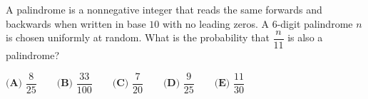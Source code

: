 A palindrome is a nonnegative integer that reads the same forwards and backwards when written in base $10$ with no leading zeros. A $6$-digit palindrome $n$ is chosen uniformly at random. What is the probability that $\dfrac{n}{11}$ is also a palindrome?

$\textbf{(A) }\dfrac{8}{25}\qquad\textbf{(B) }\dfrac{33}{100}\qquad\textbf{(C) }\dfrac{7}{20}\qquad\textbf{(D) }\dfrac{9}{25}\qquad\textbf{(E) }\dfrac{11}{30}$
